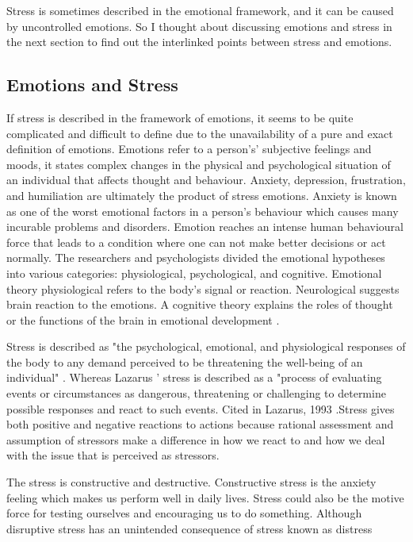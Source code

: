 Stress is sometimes described in the emotional framework, and it can be caused by uncontrolled emotions. So I thought about discussing emotions and stress in the next section to find out the interlinked points between stress and emotions. 

\subsection{Emotions and Stress}
If  stress  is  described  in  the  framework  of  emotions,  it  seems  to  be  quite  complicated  and difficult  to define  due  to the  unavailability  of  a  pure  and  exact  definition of emotions. Emotions refer to a person's’ subjective feelings and moods, it states complex changes in the physical  and  psychological  situation  of  an  individual  that  affects  thought  and behaviour. Anxiety, depression, frustration, and humiliation are ultimately the product of stress emotions. Anxiety is known as one of the worst emotional factors in a person's behaviour which causes many incurable problems and disorders. Emotion reaches an intense human behavioural force that leads to a condition where one can not make better decisions or act normally. The researchers and psychologists divided the emotional hypotheses into various categories: physiological, psychological, and cognitive.  Emotional theory physiological refers to the body's signal or reaction.  Neurological suggests brain reaction to the emotions. A cognitive theory explains the roles of thought or the functions of the brain in emotional development \citep{Ashforth1995EmotionReappraisal}.

Stress is described as "the psychological, emotional, and physiological responses of the body to any demand perceived to be threatening the well-being of an individual" \citep{Bloisi2007ManagementBehaviour}. Whereas Lazarus ' stress is described as a "process of evaluating events or circumstances as dangerous, threatening or challenging to determine possible responses and react to such events. Cited in Lazarus, 1993 \citep{Bloisi2007ManagementBehaviour}.Stress gives both positive and negative reactions to actions because rational assessment and assumption of stressors make a difference in how we react to and how we deal with the issue that is perceived as stressors.

The stress is constructive and destructive. Constructive stress is the anxiety feeling which makes us perform well in daily lives. Stress could also be the motive force for testing ourselves and encouraging us to do something. Although disruptive stress has an unintended consequence of stress known as distress \citep{Bloisi2007ManagementBehaviour}

